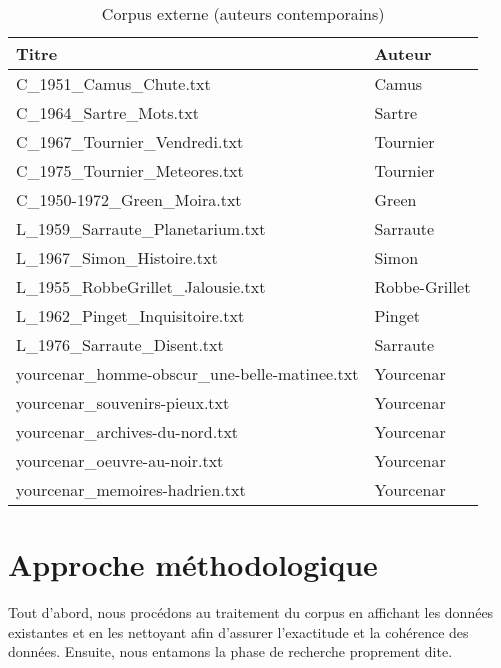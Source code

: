 \begin{table}[h!]
\centering
\begin{tabular}{|l|l|}
\hline
\textbf{Titre}                                        & \textbf{Auteur}     \\ \hline
C\_1951\_Camus\_Chute.txt                              & Camus               \\ \hline
C\_1964\_Sartre\_Mots.txt                              & Sartre              \\ \hline
C\_1967\_Tournier\_Vendredi.txt                        & Tournier            \\ \hline
C\_1975\_Tournier\_Meteores.txt                        & Tournier            \\ \hline
C\_1950-1972\_Green\_Moira.txt                         & Green               \\ \hline
L\_1959\_Sarraute\_Planetarium.txt                     & Sarraute            \\ \hline
L\_1967\_Simon\_Histoire.txt                           & Simon               \\ \hline
L\_1955\_RobbeGrillet\_Jalousie.txt                    & Robbe-Grillet       \\ \hline
L\_1962\_Pinget\_Inquisitoire.txt                      & Pinget              \\ \hline
L\_1976\_Sarraute\_Disent.txt                          & Sarraute            \\ \hline
yourcenar\_homme-obscur\_une-belle-matinee.txt         & Yourcenar           \\ \hline
yourcenar\_souvenirs-pieux.txt                         & Yourcenar           \\ \hline
yourcenar\_archives-du-nord.txt                        & Yourcenar           \\ \hline
yourcenar\_oeuvre-au-noir.txt                          & Yourcenar           \\ \hline
yourcenar\_memoires-hadrien.txt                        & Yourcenar           \\ \hline
\end{tabular}
\caption{Corpus externe (auteurs contemporains)}
\label{table:corpus_externes}
\end{table}

\clearpage

\section{Approche méthodologique}
Tout d'abord, nous procédons au traitement du corpus en affichant les données existantes et en les nettoyant afin d'assurer l'exactitude et la cohérence des données. Ensuite, nous entamons la phase de recherche proprement dite.\\

